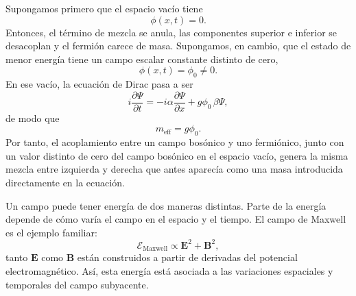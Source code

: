 Supongamos primero que el espacio vacío tiene
\begin{equation}
\phi(x,t)=0.
\end{equation}
Entonces, el término de mezcla se anula, las componentes superior e inferior se desacoplan y el fermión carece de masa. Supongamos, en cambio, que el estado de menor energía tiene un campo escalar constante distinto de cero,
\begin{equation}
\phi(x,t)=\phi_0\neq0.
\end{equation}
En ese vacío, la ecuación de Dirac pasa a ser
\begin{equation}
i\frac{\partial\Psi}{\partial t}
=
-i\alpha\frac{\partial\Psi}{\partial x}
+g\phi_0\,\beta\Psi,
\end{equation}
de modo que
\begin{equation}
m_{\mathrm{eff}}=g\phi_0.
\end{equation}
Por tanto, el acoplamiento entre un campo bosónico y uno fermiónico, junto con un valor distinto de cero del campo bosónico en el espacio vacío, genera la misma mezcla entre izquierda y derecha que antes aparecía como una masa introducida directamente en la ecuación.

\begin{classroomqa}
\end{classroomqa}

\begin{classroomqa}
\end{classroomqa}

Un campo puede tener energía de dos maneras distintas. Parte de la energía depende de cómo varía el campo en el espacio y el tiempo. El campo de Maxwell es el ejemplo familiar:
\begin{equation}
\mathcal{E}_{\mathrm{Maxwell}}\propto \mathbf E^2+\mathbf B^2,
\end{equation}
tanto \(\mathbf E\) como \(\mathbf B\) están construidos a partir de derivadas del potencial electromagnético. Así, esta energía está asociada a las variaciones espaciales y temporales del campo subyacente.


